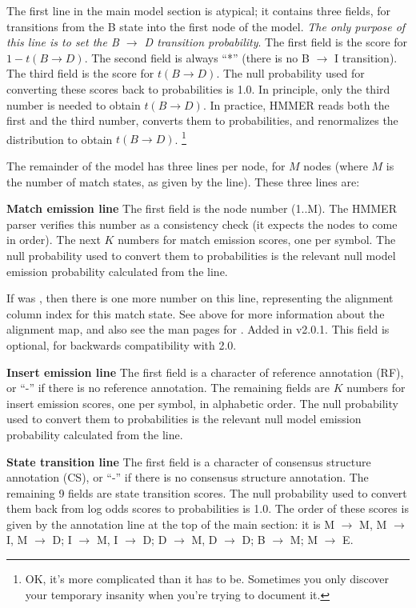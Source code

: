 The first line in the main model section is atypical; it contains
three fields, for transitions from the B state into the first node of
the model. \textit{The only purpose of this line is to set the B
$\rightarrow$ D transition probability}. The first field is the score
for $ 1 - t(B \rightarrow D)$. The second field is always ``*'' (there is no B
$\rightarrow$ I transition). The third field is the score for
$t(B\rightarrow D)$. The null probability used for converting these
scores back to probabilities is 1.0. In principle, only the third
number is needed to obtain $t(B \rightarrow D)$.  In practice, HMMER
reads both the first and the third number, converts them to
probabilities, and renormalizes the distribution to obtain $t(B
\rightarrow D)$. \footnote{OK, it's more complicated than it has to
be. Sometimes you only discover your temporary insanity when you're
trying to document it.}

The remainder of the model has three lines per node, for $M$ nodes
(where $M$ is the number of match states, as given by the 
line). These three lines are:

\begin{wideitem}

\item [\textbf{Match emission line}] The first field is the node number (1..M).
The HMMER parser verifies this number as a consistency check (it
expects the nodes to come in order). The next $K$ numbers for match
emission scores, one per symbol. The null probability used to convert
them to probabilities is the relevant null model emission probability
calculated from the  line.

If  was , then there is one more number on this
line, representing the alignment column index for this match state.
See  above for more information about the alignment map, and
also see the man pages for .  Added in
v2.0.1. This field is optional, for backwards compatibility with 2.0.

\item [\textbf{Insert emission line}] The first field is a character of
reference annotation (RF), or ``-'' if there is no reference
annotation. The remaining fields are $K$ numbers for insert emission
scores, one per symbol, in alphabetic order. The null probability used
to convert them to probabilities is the relevant null model emission
probability calculated from the  line.

\item [\textbf{State transition line}] The first field is a character
of consensus structure annotation (CS), or ``-'' if there is no
consensus structure annotation. The remaining 9 fields are state
transition scores. The null probability used to convert them back from
log odds scores to probabilities is 1.0. The order of these scores is
given by the annotation line at the top of the main section: it is M
$\rightarrow$ M, M $\rightarrow$ I, M $\rightarrow$ D; I $\rightarrow$
M, I $\rightarrow$ D; D $\rightarrow$ M, D $\rightarrow$ D; B
$\rightarrow$ M; M $\rightarrow$ E.

\end{wideitem}

